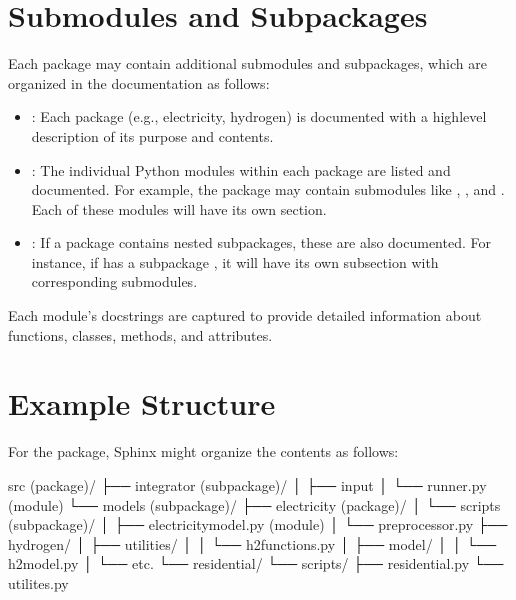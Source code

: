 \documentclass[letterpaper,10pt,english]{sphinxmanual}
\begin{document}
\section{Submodules and Subpackages}
\label{\detokenize{index:submodules-and-subpackages}}
\sphinxAtStartPar
Each package may contain additional submodules and subpackages, which are organized in the documentation as follows:
\begin{itemize}
\item {} 
\sphinxAtStartPar
{}: Each package (e.g., electricity, hydrogen) is documented with a high\sphinxhyphen{}level description of its purpose and contents.

\item {} 
\sphinxAtStartPar
{}: The individual Python modules within each package are listed and documented. For example, the  package may contain submodules like , , and . Each of these modules will have its own section.

\item {} 
\sphinxAtStartPar
{}: If a package contains nested subpackages, these are also documented. For instance, if  has a subpackage , it will have its own subsection with corresponding submodules.

\end{itemize}

\sphinxAtStartPar
Each module’s docstrings are captured to provide detailed information about functions, classes, methods, and attributes.


\section{Example Structure}
\label{\detokenize{index:example-structure}}
\sphinxAtStartPar
For the  package, Sphinx might organize the contents as follows:

\begin{sphinxVerbatim}[commandchars=\\\{\}]
src (package)/
├── integrator (subpackage)/
│   ├── input
│   └── runner.py (module)
└── models (subpackage)/
   ├── electricity (package)/
   │   └── scripts (subpackage)/
   │       ├── electricity\PYGZus{}model.py (module)
   │       └── preprocessor.py
   ├── hydrogen/
   │   ├── utilities/
   │   │   └── h2\PYGZus{}functions.py
   │   ├── model/
   │   │   └── h2\PYGZus{}model.py
   │   └── etc.
   └── residential/
      └── scripts/
            ├── residential.py
            └── utilites.py
\end{sphinxVerbatim}
\end{document}
